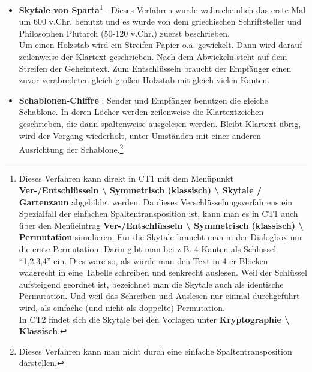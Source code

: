 \begin{refsegment}
\begin{itemize}
\item {\bf Skytale von Sparta}\footnote{%
    Dieses Verfahren kann direkt in CT1 mit dem Menüpunkt
    {\bf Ver-/Entschlüsseln \textbackslash{} Symmetrisch (klassisch)
    \textbackslash{} Skytale / Gartenzaun} abgebildet werden.
    Da dieses Verschlüsselungsverfahrens ein Spezialfall der einfachen
    Spaltentransposition ist, kann man es in CT1 auch
    über den Menüeintrag {\bf Ver-/Entschlüsseln \textbackslash{}
    Symmetrisch (klassisch) \textbackslash{} Permutation} simulieren: Für die
    Skytale braucht man in der Dialogbox nur die erste Permutation. Darin gibt
    man bei z.B. 4 Kanten als Schlüssel  "`1,2,3,4"'  ein. Dies wäre so, als
    würde man den Text in 4-er Blöcken waagrecht in eine Tabelle schreiben und
    senkrecht auslesen.
    Weil der Schlüssel aufsteigend geordnet ist, bezeichnet man die Skytale
    auch als identische Permutation. Und weil das Schreiben und Auslesen nur
    einmal durchgeführt wird, als einfache (und nicht als doppelte) Permutation.\\
    In CT2 findet sich die Skytale bei den Vorlagen unter
    {\bf Kryptographie \textbackslash{} Klassisch}.
   }
   \cite{Singh2001}%
   :
   Dieses Verfahren wurde wahrscheinlich das erste Mal um 600 v.Chr.
   benutzt und es wurde von dem griechischen Schriftsteller und Philosophen
   Plutarch (50-120 v.Chr.) zuerst beschrieben.\\
   Um einen Holzstab wird ein Streifen Papier o.ä. gewickelt. Dann wird
   darauf zeilenweise der Klartext geschrieben. Nach dem Abwickeln steht
   auf dem Streifen der Geheimtext. Zum Entschlüsseln braucht der Empfänger
   einen zuvor verabredeten gleich großen Holzstab mit gleich vielen Kanten.


\item {\bf Schablonen-Chiffre} \cite{Goebel2014}: Sender und Empfänger
   benutzen die gleiche Schablone. In deren Löcher werden zeilenweise die
   Klartextzeichen geschrieben, die dann spaltenweise ausgelesen werden.
   Bleibt Klartext übrig, wird der Vorgang wiederholt, unter Umständen
   mit einer anderen Ausrichtung der Schablone.\footnote{%
   Dieses Verfahren kann man nicht durch eine einfache Spaltentransposition
   darstellen.}



\end{itemize}
\end{refsegment}

